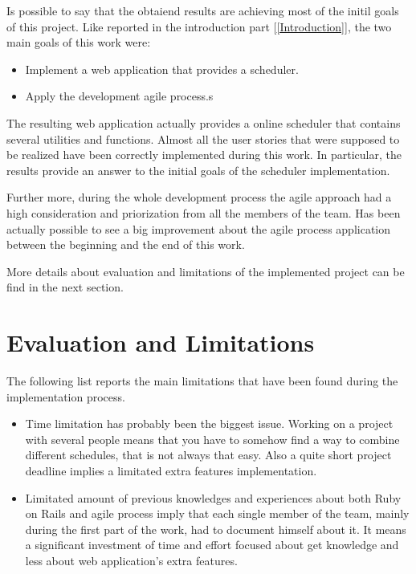 Is possible to say that the obtaiend results are achieving most of the initil goals of this project. 
Like reported in the introduction part [\ref{Introduction}], the two main goals of this work were: 
\vspace{-5mm}
\begin{itemize}
 \setlength{\itemsep}{-5pt}
 \item Implement a web application that provides a scheduler.
 \item Apply the development agile process.s
\end{itemize}

The resulting web application actually provides a online scheduler that contains several utilities and functions. Almost all the user stories that were supposed to be realized have been correctly implemented during this work. In particular, the results provide an answer to the initial goals of the scheduler implementation. 

Further more, during the whole development process the agile approach had a high consideration and priorization from all the members of the team. Has been actually possible to see a big improvement about the agile process application between the beginning and the end of this work.

More details about evaluation and limitations of the implemented project can be find in the next section.
\section{Evaluation and Limitations}
\label{Evaluation}
The following list reports the main limitations that have been found during the implementation process.
\vspace{-5mm}
\begin{itemize}
 \setlength{\itemsep}{-5pt}
\item Time limitation has probably been the biggest issue. Working on a project with several people means that you have to somehow find a way to combine different schedules, that is not always that easy. Also a quite short project deadline implies a limitated extra features implementation.
\item Limitated amount of previous knowledges and experiences about both Ruby on Rails and agile process imply that each single member of the team, mainly during the first part of the work, had to document himself about it. It means a significant investment of time and effort focused about get knowledge and less about web application's extra features. 
\end{itemize}

